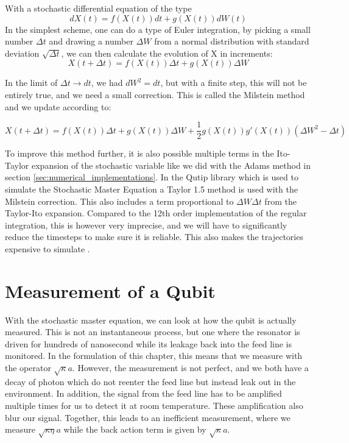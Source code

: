 With a stochastic differential equation of the type 
\begin{equation}\label{eq:stochastic_diff_equation_numerical}
    dX(t) = f(X(t))dt + g(X(t)) dW(t) 
\end{equation}
In the simplest scheme, one can do a type of Euler integration, by picking a small number $\Delta t$ and drawing a number $\Delta W$ from a normal distribution with standard deviation $\sqrt{\Delta t}$, we can then calculate the evolution of X in increments:
\begin{equation}
    X(t + \Delta t) = f(X(t))\Delta t + g(X(t)) \Delta W
\end{equation}

In the limit of $\Delta t \to dt$, we had $dW^2 = dt$, but with a finite step, this will not be entirely true, and we need a small correction. This is called the Milstein method \cite{giles_numerical_nodate} and we update according to:
\begin{fullwidth}
\raggedleft
\begin{equation}
    X(t + \Delta t) = f(X(t))\Delta t + g(X(t)) \Delta W + \frac12 g(X(t))g'(X(t))\left(\Delta W^2 - \Delta t \right)
\end{equation}
\end{fullwidth}
To improve this method further, it is also possible multiple terms in the Ito-Taylor expansion of the stochastic variable like we did with the Adams method in section \ref{sec:numerical_implementations}. In the Qutip library which is used to simulate the Stochastic Master Equation a Taylor 1.5 method is used with the Milstein correction. This also includes a term proportional to $\Delta W \Delta t$ from the Taylor-Ito expansion. Compared to the 12th order implementation of the regular integration, this is however very imprecise, and we will have to significantly reduce the timesteps to make sure it is reliable. This also makes the trajectories expensive to simulate \cite{johansson_qutip_2012}.



\section{Measurement of a Qubit}
With the stochastic master equation, we can look at how the qubit is actually measured. This is not an instantaneous process, but one where the resonator is driven for hundreds of nanosecond while its leakage back into the feed line is monitored. In the formulation of this chapter, this means that we measure with the operator $\sqrt{\kappa} a$. 
However,  the measurement is not perfect, and we both have a decay of photon which do not reenter the feed line but instead leak out in the environment. In addition, the signal from the feed line has to be amplified multiple times for us to detect it at room temperature. These amplification also blur our signal. Together, this leads to an inefficient measurement, where we measure $\sqrt{\kappa\eta} a$ while the back action term is given by $\sqrt{\kappa}a$.

